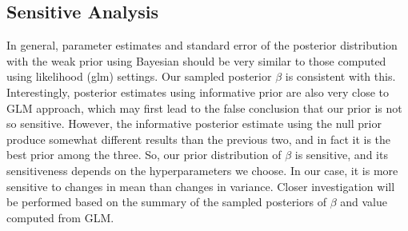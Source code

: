 \documentclass[paper=letterpaper,fontsize=12pt,twoside,american]{scrartcl}
\begin{document}
\subsection{Sensitive Analysis}
In general, parameter estimates and standard error of the posterior distribution with the weak prior using Bayesian should be very similar to those computed using likelihood (glm) settings. Our sampled posterior $\beta$ is consistent with this. Interestingly, posterior estimates using informative prior are also very close to GLM approach, which may first lead to the false conclusion that our prior is not so sensitive. However, the informative posterior estimate using the null prior produce somewhat different results than the previous two, and in fact it is the best prior among the three. So, our prior distribution of $\beta$ is sensitive, and its sensitiveness depends on the hyperparameters we choose. In our case, it is more sensitive to changes in mean than changes in variance. Closer investigation will be performed based on the summary of the sampled posteriors of $\beta$ and value computed from GLM.
\end{document}
